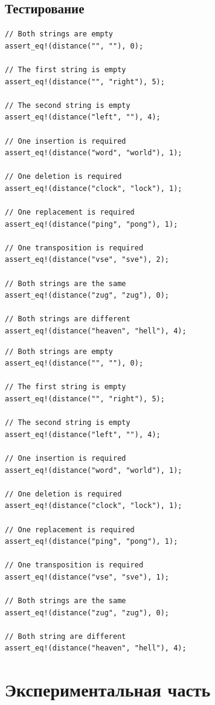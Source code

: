 \documentclass[oneside, a4paper, 12pt]{article}
\begin{document}
\subsection{Тестирование}

\begin{lstlisting}[caption=Тесты алгоритмов поиска расстояния Левенштейна]
// Both strings are empty
assert_eq!(distance("", ""), 0);

// The first string is empty
assert_eq!(distance("", "right"), 5);

// The second string is empty
assert_eq!(distance("left", ""), 4);

// One insertion is required
assert_eq!(distance("word", "world"), 1);

// One deletion is required
assert_eq!(distance("clock", "lock"), 1);

// One replacement is required
assert_eq!(distance("ping", "pong"), 1);

// One transposition is required
assert_eq!(distance("vse", "sve"), 2);

// Both strings are the same
assert_eq!(distance("zug", "zug"), 0);

// Both strings are different
assert_eq!(distance("heaven", "hell"), 4);
\end{lstlisting}

\begin{lstlisting}[caption=Тесты реализаций алгоритмов поиска расстояния Дамерау-Левенштейна]
// Both strings are empty
assert_eq!(distance("", ""), 0);

// The first string is empty
assert_eq!(distance("", "right"), 5);

// The second string is empty
assert_eq!(distance("left", ""), 4);

// One insertion is required
assert_eq!(distance("word", "world"), 1);

// One deletion is required
assert_eq!(distance("clock", "lock"), 1);

// One replacement is required
assert_eq!(distance("ping", "pong"), 1);

// One transposition is required
assert_eq!(distance("vse", "sve"), 1);

// Both strings are the same
assert_eq!(distance("zug", "zug"), 0);

// Both string are different
assert_eq!(distance("heaven", "hell"), 4);
\end{lstlisting}

\section{Экспериментальная часть}
\end{document}
